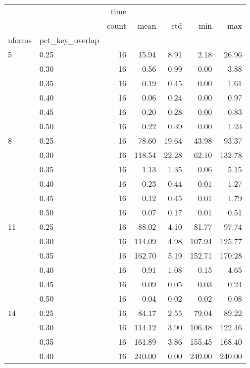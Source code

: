 \documentclass[11pt]{article}
\begin{document}
\begin{table}
  \centering
  \begin{tabular}{llrrrrr}
    \toprule
    &      &  time &        &       &        &        \\
    &      & count &   mean &   std &    min &    max \\
    nforms & pct\_key\_overlap &       &        &       &        &        \\
    \midrule
    5  & 0.25 &    16 &  15.94 &  8.91 &   2.18 &  26.96 \\
    & 0.30 &    16 &   0.56 &  0.99 &   0.00 &   3.88 \\
    & 0.35 &    16 &   0.19 &  0.45 &   0.00 &   1.61 \\
    & 0.40 &    16 &   0.06 &  0.24 &   0.00 &   0.97 \\
    & 0.45 &    16 &   0.20 &  0.28 &   0.00 &   0.83 \\
    & 0.50 &    16 &   0.22 &  0.39 &   0.00 &   1.23 \\
    \hline
    8  & 0.25 &    16 &  78.60 & 19.64 &  43.98 &  93.37 \\
    & 0.30 &    16 & 118.54 & 22.28 &  62.10 & 132.78 \\
    & 0.35 &    16 &   1.13 &  1.35 &   0.06 &   5.15 \\
    & 0.40 &    16 &   0.23 &  0.44 &   0.01 &   1.27 \\
    & 0.45 &    16 &   0.12 &  0.45 &   0.01 &   1.79 \\
    & 0.50 &    16 &   0.07 &  0.17 &   0.01 &   0.51 \\
    \hline
    11 & 0.25 &    16 &  88.02 &  4.10 &  81.77 &  97.74 \\
    & 0.30 &    16 & 114.09 &  4.98 & 107.94 & 125.77 \\
    & 0.35 &    16 & 162.70 &  5.19 & 152.71 & 170.28 \\
    & 0.40 &    16 &   0.91 &  1.08 &   0.15 &   4.65 \\
    & 0.45 &    16 &   0.09 &  0.05 &   0.03 &   0.24 \\
    & 0.50 &    16 &   0.04 &  0.02 &   0.02 &   0.08 \\
    \hline
    14 & 0.25 &    16 &  84.17 &  2.55 &  79.04 &  89.22 \\
    & 0.30 &    16 & 114.12 &  3.90 & 106.48 & 122.46 \\
    & 0.35 &    16 & 161.89 &  3.86 & 155.45 & 168.40 \\
    & 0.40 &    16 & 240.00 &  0.00 & 240.00 & 240.00 \\

\end{tabular}
\end{table}
\end{document}
